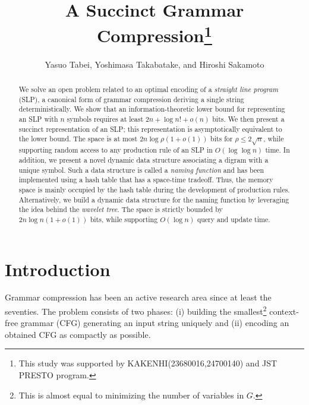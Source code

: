 \documentclass[10pt]{llncs}
\begin{document}
\title{
A Succinct Grammar Compression\thanks{
This study was supported by KAKENHI(23680016,24700140) and JST PRESTO program.
}
}

\author{
Yasuo Tabei, 
Yoshimasa Takabatake, and
Hiroshi Sakamoto
}

\maketitle

\begin{abstract}
We solve an open problem related to an optimal encoding of 
a {\em straight line program} (SLP), a canonical form of grammar compression
deriving a single string deterministically.
We show that an information-theoretic lower bound for representing an SLP with $n$ symbols 
requires at least $2n+\log n!+o(n)$ bits. 
We then present a succinct representation of an SLP; this representation is asymptotically equivalent to the lower bound.
The space is at most $2n\log\rho(1+o(1))$ bits for $\rho \leq 2\sqrt{n}$, while supporting random access to any production rule of 
an SLP in $O(\log\log n)$ time.
In addition, we present a novel dynamic data structure associating a digram with a unique symbol.
Such a data structure is called a {\em naming function} and has been implemented using a hash table that has a space-time tradeoff.
Thus, the memory space is mainly occupied by the hash table during the development of production rules.
Alternatively, we build a dynamic data structure for the naming function by leveraging the idea behind the {\em wavelet tree}.
The space is strictly bounded by $2n\log n(1+o(1))$ bits, while supporting $O(\log n)$ query and update time.
\end{abstract}

\section{Introduction}
Grammar compression has been an active research area since at least the seventies.
The problem consists of two phases: 
(i) building the smallest\footnote{This is almost equal to minimizing the number of variables in $G$.} 
context-free grammar (CFG) generating an input string uniquely 
and (ii) encoding an obtained CFG as compactly as possible. 
\end{document}
